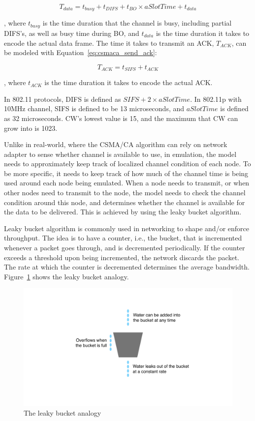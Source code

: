 \documentclass[12pt]{report}
\begin{document}
\begin{equation}
  T_{data}=t_{busy}+t_{DIFS}+t_{BO}\times aSlotTime+t_{data}
  \label{eq:csmaca_send_data}
\end{equation}

, where $t_{busy}$ is the time duration that the channel is busy, including partial DIFS's, as well as busy time during BO, and $t_{data}$ is the time duration it takes to encode the actual data frame. The time it takes to transmit an ACK, $T_{ACK}$, can be modeled with Equation~\ref{eq:csmaca_send_ack}:

\begin{equation}
  T_{ACK}=t_{SIFS}+t_{ACK}
  \label{eq:csmaca_send_ack}
\end{equation}

, where $t_{ACK}$ is the time duration it takes to encode the actual ACK.

In 802.11 protocols, DIFS is defined as $SIFS + 2 \times aSlotTime$. In 802.11p with 10MHz channel, SIFS is defined to be 13 microseconds, and $aSlotTime$ is defined as 32 microseconds. CW's lowest value is 15, and the maximum that CW can grow into is 1023. \cite{ieee201280211macphy}

Unlike in real-world, where the CSMA/CA algorithm can rely on network adapter to sense whether channel is available to use, in emulation, the model needs to approximately keep track of localized channel condition of each node. To be more specific, it needs to keep track of how much of the channel time is being used around each node being emulated. When a node needs to transmit, or when other nodes need to transmit to the node, the model needs to check the channel condition around this node, and determines whether the channel is available for the data to be delivered. This is achieved by using the leaky bucket algorithm.

Leaky bucket algorithm \cite{turner1986,yin1991} is commonly used in networking to shape and/or enforce throughput. The idea is to have a counter, i.e., the bucket, that is incremented whenever a packet goes through, and is decremented periodically. If the counter exceeds a threshold upon being incremented, the network discards the packet. The rate at which the counter is decremented determines the average bandwidth. Figure~\ref{fig:leaky_bucket} shows the leaky bucket analogy.

\begin{figure}[h]
  \begin{center}
    \includegraphics[width=.6\textwidth]{figures/leakyBucket.pdf}
    \caption{\label{fig:leaky_bucket}The leaky bucket analogy}
  \end{center}
\end{figure}
\end{document}
